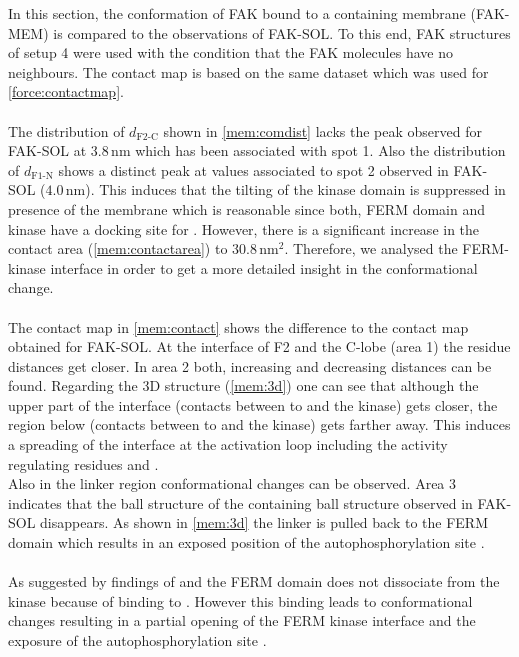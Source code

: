 In this section, the conformation of FAK bound to a \pip{} containing membrane (FAK-MEM) is compared to the observations of FAK-SOL. To this end, FAK structures of setup 4 were used with the condition that the FAK molecules have no neighbours. The contact map is based on the same dataset which was used for \autoref{force:contactmap}.\\
\\
The distribution of $d_\text{F2-C}$ shown in \autoref{mem:comdist} lacks the peak observed for FAK-SOL at $3.8\,\si{\nano\metre}$ which has been associated with spot 1. Also the distribution of $d_\text{F1-N}$ shows a distinct peak at values associated to spot 2 observed in FAK-SOL ($4.0\,\si{\nano\metre}$). This induces that the tilting of the kinase domain is suppressed in presence of the membrane which is reasonable since both, FERM domain and kinase have a docking site for \pip{}. However, there is a significant increase in the contact area (\autoref{mem:contactarea}) to $30.8\,\si{\nano\metre}^2$. Therefore, we analysed the FERM-kinase interface in order to get a more detailed insight in the conformational change.\\
\\
The contact map in \autoref{mem:contact} shows the difference to the contact map obtained for FAK-SOL. At the interface of F2 and the C-lobe (area 1) the residue distances get closer. In area 2 both, increasing and decreasing distances can be found. Regarding the 3D structure (\autoref{mem:3d}) one can see that although the upper part of the interface (contacts between  to  and the kinase) gets closer, the region below (contacts between  to  and the kinase) gets farther away. This induces a spreading of the interface at the activation loop including the activity regulating residues  and .\\
Also in the linker region conformational changes can be observed. Area 3 indicates that the ball structure of the  containing ball structure observed in FAK-SOL disappears. As shown in \autoref{mem:3d} the linker is pulled back to the FERM domain which results in an exposed position of the autophosphorylation site .\\
\\
As suggested by findings of \textcite{pap001} and \textcite{pap003} the FERM domain does not dissociate from the kinase because of binding to \pip{}. However this binding leads to conformational changes resulting in a partial opening of the FERM kinase interface and the exposure of the autophosphorylation site .
